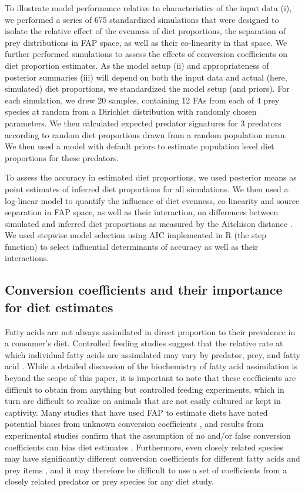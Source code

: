 \documentclass[12pt]{article}
\begin{document}
To illustrate model performance relative to characteristics of the
input data (i), we performed a series of 675 standardized simulations that
were designed to isolate the relative effect of the evenness of diet proportions,
the separation of prey distributions in FAP space, as well as their
co-linearity in that space. We further performed simulations to assess
the effects of conversion coefficients on diet proportion
estimates. As the model setup (ii) and appropriateness of posterior
summaries (iii) will depend on both the input data and actual (here,
simulated) diet proportions, we standardized the model setup (and
priors). For each simulation, we drew 20 samples, containing 12
FAs from each of 4 prey species
at random from a Dirichlet distribution with randomly chosen
parameters. We then calculated expected predator signatures for 3
predators according to random diet proportions drawn from a random
population mean. We then used a model with default priors to estimate
population level diet proportions for these predators. 

To assess the accuracy in estimated diet proportions, we used posterior means as point estimates of inferred diet
proportions for all simulations. We then used a log-linear model to
quantify the influence of diet evenness, co-linearity and source separation in FAP
space, as well as their interaction, on differences between simulated
and inferred diet proportions as measured by the Aitchison distance \citep{aitchison_logratio_2000}. We used stepwise model selection using
AIC implemented in R (the step function) to select
influential determinants of accuracy as well as their interactions.

\subsection{Conversion coefficients and their importance for diet
  estimates}

Fatty acids are not always assimilated in direct proportion to their
prevalence in a consumer’s diet. Controlled feeding studies suggest
that the relative rate at which individual fatty acids are assimilated
may vary by predator, prey, and fatty acid \citep{rosen_effects_2012}. While a detailed discussion of the biochemistry of fatty acid
assimilation is beyond the scope of this paper, it is important to
note that these coefficients are difficult to obtain from anything but
controlled feeding experiments, which in turn are difficult to realize
on animals that are not easily cultured or kept in captivity. Many
studies that have used FAP to estimate diets have noted potential
biases from unknown conversion coefficients \citep[e.g.][]{iverson_quantitative_2004,meynier_quantitative_2010}, and results from
experimental studies confirm that the assumption of no and/or false
conversion coefficients can bias diet estimates \citep{rosen_effects_2012}. Furthermore,
  even closely related species may have significantly different
  conversion coefficients for different fatty acids and prey items
  \citep{rosen_effects_2012}, and it may therefore be difficult to use a
  set of coefficients from a closely related predator or prey species
  for any diet study.
\end{document}
